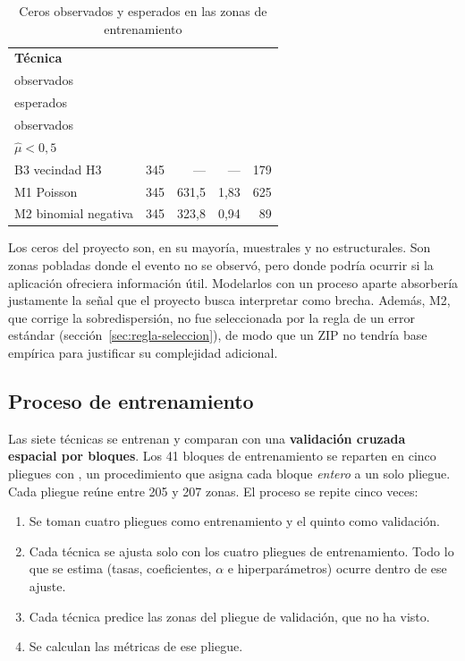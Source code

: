 \begin{table}[H]
  \centering
  \caption{Ceros observados y esperados en las zonas de entrenamiento}
  \label{tab:ceros-esperados}
  \interlineadoSimple
  \small
  \begin{tabular}{@{}lrrrr@{}}
    \toprule
    \textbf{Técnica} & \textbf{\celda{Ceros\\observados}} & \textbf{\celda{Ceros\\esperados}} & \textbf{\celda{Esperados /\\observados}} & \textbf{\celda{Zonas con\\$\hat{\mu} < 0{,}5$}} \\
    \midrule
    B3 vecindad H3 & 345 & --- & --- & 179 \\
    M1 Poisson & 345 & 631,5 & 1,83 & 625 \\
    M2 binomial negativa & 345 & 323,8 & 0,94 & 89 \\
    \bottomrule
  \end{tabular}
\end{table}

Los ceros del proyecto son, en su mayoría, muestrales y no estructurales. Son zonas
pobladas donde el evento no se observó, pero donde podría ocurrir si la aplicación
ofreciera información útil. Modelarlos con un proceso aparte absorbería justamente la señal
que el proyecto busca interpretar como brecha. Además, M2, que corrige la sobredispersión,
no fue seleccionada por la regla de un error estándar
(sección~\ref{sec:regla-seleccion}), de modo que un ZIP no tendría base empírica para
justificar su complejidad adicional.

\subsection{Proceso de entrenamiento}
\label{sec:proceso-entrenamiento}

Las siete técnicas se entrenan y comparan con una \textbf{validación cruzada espacial por
bloques}. Los 41 bloques de entrenamiento se reparten en cinco pliegues con
, un procedimiento que asigna cada bloque \emph{entero} a un solo pliegue.
Cada pliegue reúne entre 205 y 207 zonas. El proceso se repite cinco veces:
\begin{enumerate}
  \item Se toman cuatro pliegues como entrenamiento y el quinto como validación.
  \item Cada técnica se ajusta solo con los cuatro pliegues de entrenamiento. Todo lo que
        se estima (tasas, coeficientes, $\alpha$ e hiperparámetros) ocurre dentro de ese
        ajuste.
  \item Cada técnica predice las zonas del pliegue de validación, que no ha visto.
  \item Se calculan las métricas de ese pliegue.
\end{enumerate}

